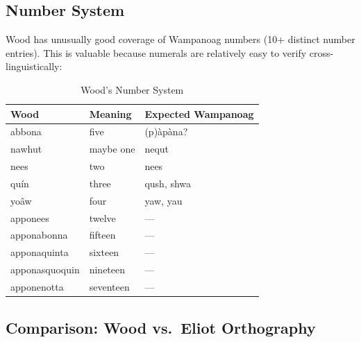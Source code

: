 \subsection{Number System}

Wood has unusually good coverage of Wampanoag numbers (10+ distinct number
entries). This is valuable because numerals are relatively easy to verify
cross-linguistically:

\begin{table}[htbp]
\centering
\caption{Wood's Number System}
\label{tab:1367-numbers}
\begin{tabular}{lll}
\hline
Wood & Meaning & Expected Wampanoag \\
\hline
abbona & five & (p)àpàna? \\
nawhut & maybe one & nequt \\
nees & two & nees \\
quín & three & qush, shwa \\
yoâw & four & yaw, yau \\
apponees & twelve & --- \\
apponabonna & fifteen & --- \\
apponaquinta & sixteen & --- \\
apponasquoquin & nineteen & --- \\
apponenotta & seventeen & --- \\
\hline
\end{tabular}
\end{table}

\subsection{Comparison: Wood vs.\ Eliot Orthography}

